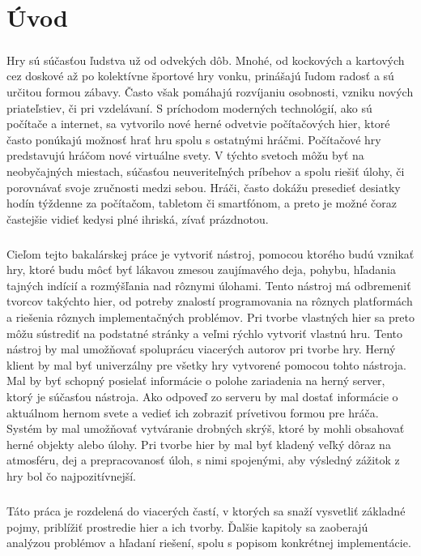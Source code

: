 \chapter{Úvod}
\paragraph{}
Hry sú súčasťou ľudstva už od odvekých dôb. Mnohé, od kockových a kartových cez doskové až po kolektívne športové hry vonku, prinášajú ľudom radosť a sú určitou formou zábavy. Často však pomáhajú rozvíjaniu osobnosti, vzniku nových priateľstiev, či pri vzdelávaní. S príchodom moderných technológií, ako sú počítače a internet, sa vytvorilo nové herné odvetvie počítačových hier, ktoré často ponúkajú možnosť hrať hru spolu s ostatnými hráčmi. Počítačové hry predstavujú hráčom nové virtuálne svety. V týchto svetoch môžu byť na neobyčajných miestach, súčasťou neuveriteľných príbehov a spolu riešiť úlohy, či porovnávať svoje zručnosti medzi sebou. Hráči, často dokážu presedieť desiatky hodín týždenne za počítačom, tabletom či smartfónom, a preto je možné čoraz častejšie vidieť kedysi plné ihriská, zívať prázdnotou. 

\paragraph{}
Cieľom tejto bakalárskej práce je vytvoriť nástroj, pomocou ktorého budú vznikať hry, ktoré budu môcť byť lákavou zmesou zaujímavého deja, pohybu, hľadania tajných indícií a rozmýšľania nad rôznymi úlohami. Tento nástroj má odbremeniť tvorcov takýchto hier, od potreby znalostí programovania na rôznych platformách a riešenia rôznych implementačných problémov. Pri tvorbe vlastných hier sa preto môžu sústrediť na podstatné stránky a veľmi rýchlo vytvoriť vlastnú hru. Tento nástroj by mal umožňovať spoluprácu viacerých autorov pri tvorbe hry. Herný klient by mal byť univerzálny pre všetky hry vytvorené pomocou tohto nástroja. Mal by byť schopný posielať informácie o polohe zariadenia na herný server, ktorý je súčasťou nástroja. Ako odpoveď zo serveru by mal dostať informácie o aktuálnom hernom svete a vedieť ich zobraziť prívetivou formou pre hráča. Systém by mal umožňovať vytváranie drobných skrýš, ktoré by mohli obsahovať herné objekty alebo úlohy. Pri tvorbe hier by mal byť kladený veľký dôraz na atmosféru, dej a prepracovanosť úloh, s nimi spojenými, aby výsledný zážitok z hry bol čo najpozitívnejší. 

\paragraph{}
Táto práca je rozdelená do viacerých častí, v ktorých sa snaží vysvetliť základné pojmy, priblížiť prostredie hier a ich tvorby. Ďalšie kapitoly sa zaoberajú analýzou problémov a hľadaní riešení, spolu s popisom konkrétnej implementácie.